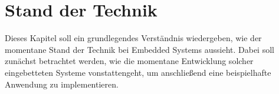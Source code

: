 \chapter{Stand der Technik}
\label{chap:standTechnik}
Dieses Kapitel soll ein grundlegendes Verständnis wiedergeben, wie der momentane Stand der
Technik bei Embedded Systems aussieht. Dabei soll zunächst betrachtet werden, wie die
momentane Entwicklung solcher eingebetteten Systeme vonstattengeht, um anschließend eine
beispielhafte Anwendung zu implementieren.
